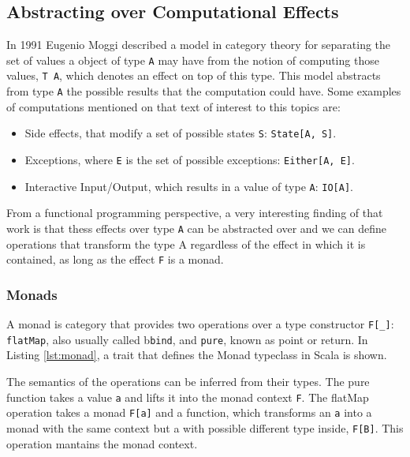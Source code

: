 \documentclass[../main.tex]{subfiles}
\begin{document}
\subsection{Abstracting over Computational Effects}
In 1991 Eugenio Moggi \autocite{Moggi1991NotionsMonads} described a model
in category theory for separating the set of values a object of type \texttt{A} may have from
the notion of computing those values, \texttt{T A}, which denotes an effect on top of
this type. This model abstracts from type \texttt{A} the possible
results that the computation could have. Some examples of computations mentioned
on that text of interest to this topics are:

\begin{itemize}
\item Side effects, that modify a set of possible states \texttt{S}: \texttt{State[A, S]}.
\item Exceptions, where \texttt{E} is the set of possible exceptions: \texttt{Either[A, E]}.
\item Interactive Input/Output, which results in a value of type \texttt{A}: \texttt{IO[A]}.
\end{itemize}

From a functional programming perspective, a very interesting finding of that
work is that thess effects over type \texttt{A} can be abstracted over and we can define
operations that transform the type A regardless of the effect in which it is
contained, as long as the effect \texttt{F} is a monad. %

\subsubsection{Monads}
A monad is category that provides two operations over a type constructor
\texttt{F[\_]}: \texttt{flatMap}, also usually called b\texttt{bind}, and \texttt{pure},
known as point or return. In Listing \ref{lst:monad}, a trait that defines the
Monad typeclass in Scala is shown.



The semantics of the operations can be inferred from their types.
The pure function takes a value \texttt{a} and lifts it into the monad context
\texttt{F}. The flatMap operation takes a monad \texttt{F[a]} and a function,
which transforms an \texttt{a} into a monad with the same context but a with possible
different type inside, \texttt{F[B]}. This operation mantains the monad context.
\end{document}
